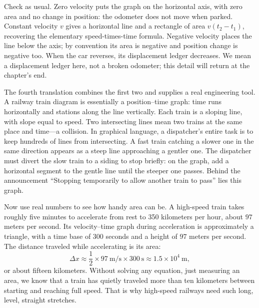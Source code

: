 \begin{center}
\end{center}

Check as usual. Zero velocity puts the graph on the horizontal axis, with zero area and no change in position: the odometer does not move when parked. Constant velocity \(v\) gives a horizontal line and a rectangle of area \(v(t_2-t_1)\), recovering the elementary speed-times-time formula. Negative velocity places the line below the axis; by convention its area is negative and position change is negative too. When the car reverses, its displacement ledger decreases. We mean a displacement ledger here, not a broken odometer; this detail will return at the chapter's end.

The fourth translation combines the first two and supplies a real engineering tool. A railway train diagram is essentially a position--time graph: time runs horizontally and stations along the line vertically. Each train is a sloping line, with slope equal to speed. Two intersecting lines mean two trains at the same place and time---a collision. In graphical language, a dispatcher's entire task is to keep hundreds of lines from intersecting. A fast train catching a slower one in the same direction appears as a steep line approaching a gentler one. The dispatcher must divert the slow train to a siding to stop briefly: on the graph, add a horizontal segment to the gentle line until the steeper one passes. Behind the announcement ``Stopping temporarily to allow another train to pass'' lies this graph.

Now use real numbers to see how handy area can be. A high-speed train takes roughly five minutes to accelerate from rest to 350 kilometers per hour, about \(97\) meters per second. Its velocity--time graph during acceleration is approximately a triangle, with a time base of \(300\) seconds and a height of \(97\) meters per second. The distance traveled while accelerating is its area:
\[
\Delta x\approx\frac{1}{2}\times 97\ \text{m/s}\times 300\ \text{s}\approx 1.5\times10^{4}\ \text{m},
\]
or about fifteen kilometers. Without solving any equation, just measuring an area, we know that a train has quietly traveled more than ten kilometers between starting and reaching full speed. That is why high-speed railways need such long, level, straight stretches.

